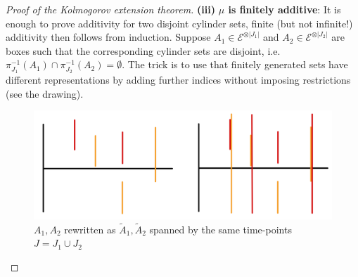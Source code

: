 \begin{proof}[Proof of the Kolmogorov extension theorem]
	\textbf{(iii)} \textbf{$\mu$ is finitely additive}: It is enough to prove additivity for two disjoint cylinder sets, finite (but not infinite!) additivity then follows from induction. Suppose $A_1\in \mathcal E^{\otimes |J_1|}$ and $A_2\in \mathcal E^{\otimes |J_2|}$ are boxes such that the corresponding cylinder sets are disjoint, i.e. $\pi_{J_1}^{-1}(A_1)\cap \pi_{J_2}^{-1}(A_2)=\emptyset$. The trick is to use that finitely generated sets have different representations by adding further indices without imposing restrictions (see the drawing). 
	\begin{figure}[h]
		\begin{center}
			\includegraphics[scale=0.08]{vereinigung.jpeg}
			\caption*{$A_1, A_2$ rewritten as $\tilde A_1, \tilde A_2$ spanned by the same time-points $J=J_1\cup J_2$}
		\end{center}
		\end{figure}


\end{proof}
